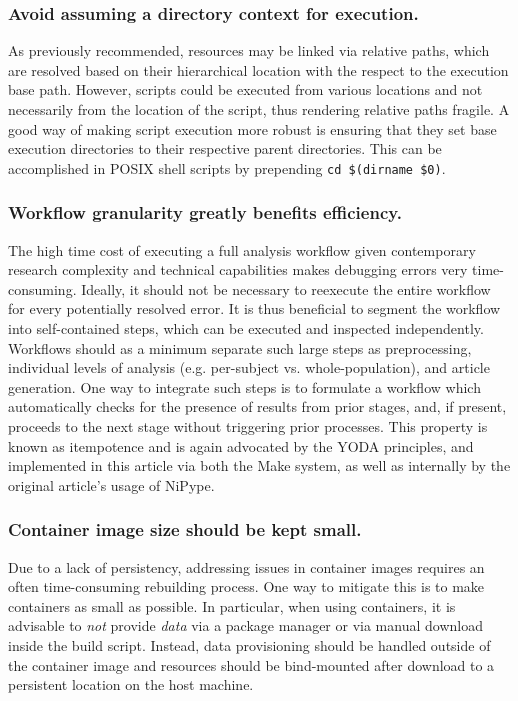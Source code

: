 \subsubsection{Avoid assuming a directory context for execution.}
As previously recommended, resources may be linked via relative paths, which are resolved based on their hierarchical location with the respect to the execution base path.
However, scripts could be executed from various locations and not necessarily from the location of the script, thus rendering relative paths fragile.
A good way of making script execution more robust is ensuring that they set base execution directories to their respective parent directories.
This can be accomplished in POSIX shell scripts by prepending \texttt{cd \textquotedbl\$(dirname \textquotedbl\$0\textquotedbl)\textquotedbl}.

\subsubsection{Workflow granularity greatly benefits efficiency.}
The high time cost of executing a full analysis workflow given contemporary research complexity and technical capabilities makes debugging errors very time-consuming.
Ideally, it should not be necessary to reexecute the entire workflow for every potentially resolved error.
It is thus beneficial to segment the workflow into self-contained steps, which can be executed and inspected independently.
Workflows should as a minimum separate such large steps as preprocessing, individual levels of analysis (e.g. per-subject vs. whole-population), and article generation.
One way to integrate such steps is to formulate a workflow which automatically checks for the presence of results from prior stages, and, if present, proceeds to the next stage without triggering prior processes.
This property is known as itempotence and is again advocated by the YODA principles, and implemented in this article via both the Make system, as well as internally by the original article's usage of NiPype.

\subsubsection{Container image size should be kept small.}
Due to a lack of persistency, addressing issues in container images requires an often time-consuming rebuilding process.
One way to mitigate this is to make containers as small as possible.
In particular, when using containers, it is advisable to \textit{not} provide \textit{data} via a package manager or via manual download inside the build script.
Instead, data provisioning should be handled outside of the container image and resources should be bind-mounted after download to a persistent location on the host machine.

